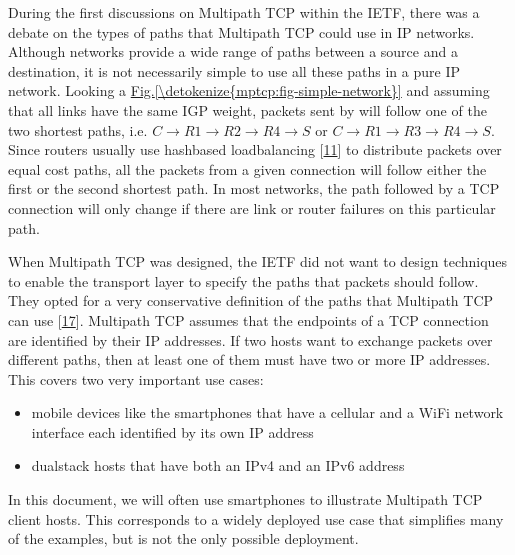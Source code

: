 \documentclass[letterpaper,10pt,english]{sphinxmanual}
\begin{document}
During the first discussions on Multipath TCP within the IETF, there was a debate on the types of paths that Multipath TCP could use in IP networks. Although networks provide a wide range of paths between a source and a destination, it is not necessarily simple to use all these paths in a pure IP network. Looking a \hyperref[\detokenize{mptcp:fig-simple-network}]{Fig.\@ \ref{\detokenize{mptcp:fig-simple-network}}} and assuming that all links have the same IGP weight, packets sent by  will follow one of the two shortest paths, i.e. \(C \rightarrow R1 \rightarrow R2 \rightarrow R4 \rightarrow S\) or \(C \rightarrow R1 \rightarrow R3 \rightarrow R4 \rightarrow S\). Since routers usually use hash\sphinxhyphen{}based load\sphinxhyphen{}balancing {[}\hyperlink{cite.biblio:id2922}{11}{]} to distribute packets over equal cost paths, all the packets from a given connection will follow either the first or the second shortest path. In most networks, the path followed by a TCP connection will only change if there are link or router failures on this particular path.

\sphinxAtStartPar
When Multipath TCP was designed, the IETF did not want to design techniques to enable the transport layer to specify the paths that packets should follow. They opted for a very conservative definition of the paths that Multipath TCP can use {[}\hyperlink{cite.biblio:id6033}{17}{]}. Multipath TCP assumes that the endpoints of a TCP connection are identified by their IP addresses. If two hosts want to exchange packets over different paths, then at least one of them must have two or more IP addresses. This covers two very important use cases:
\begin{itemize}
\item {} 
\sphinxAtStartPar
mobile devices like the smartphones that have a cellular and a Wi\sphinxhyphen{}Fi network interface each identified by its own IP address

\item {} 
\sphinxAtStartPar
dual\sphinxhyphen{}stack hosts that have both an IPv4 and an IPv6 address

\end{itemize}

\sphinxAtStartPar
In this document, we will often use smartphones to illustrate Multipath TCP client hosts. This corresponds to a widely deployed use case that simplifies many of the examples, but is not the only possible deployment.
\end{document}
